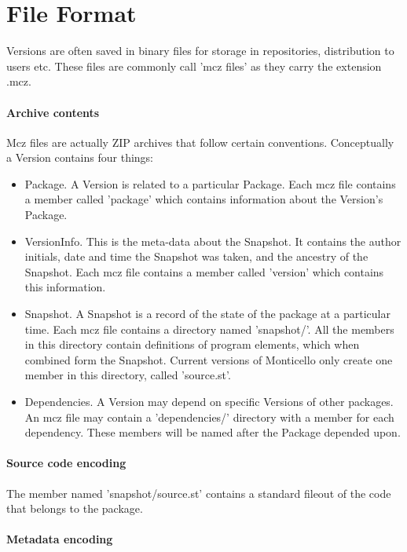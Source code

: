 \section{File Format}

Versions are often saved in binary files for storage in repositories, distribution to users etc. These files are commonly call 'mcz files' as they carry the extension .mcz.

\paragraph{Archive contents}

Mcz files are actually ZIP archives that follow certain conventions. Conceptually a Version contains four things:

\begin{itemize}
\item Package. A Version is related to a particular Package. Each mcz file contains a member called 'package' which contains information about the Version's Package.

\item VersionInfo. This is the meta-data about the Snapshot. It contains the author initials, date and time the Snapshot was taken, and the ancestry of the Snapshot. Each mcz file contains a member called 'version' which contains this information.
\item Snapshot. A Snapshot is a record of the state of the package at a particular time. Each mcz file contains a directory named 'snapshot/'. All the members in this directory contain definitions of program elements, which when combined form the Snapshot. Current versions of Monticello only create one member in this directory, called 'source.st'.
\item Dependencies. A Version may depend on specific Versions of other packages. An mcz file may contain a 'dependencies/' directory with a member for each dependency. These members will be named after the Package depended upon.
\end{itemize}

\paragraph{Source code encoding}

The member named 'snapshot/source.st' contains a standard fileout of the code that belongs to the package.

\paragraph{Metadata encoding}


